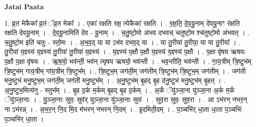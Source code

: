 \documentclass[17pt]{extarticle}
\begin{document}
\textbf{Jatai Paata} \newline

1. व्र॒त मेकैका᳚ व्र॒तं ॅव्र॒त मेका᳚ । . एका॑ रक्षति रक्ष॒ त्येकैका॑ रक्षति । . र॒क्ष॒ति॒ दे॒व॒यू॒नाम् दे॑वयू॒नाꣳ र॑क्षति रक्षति देवयू॒नाम् । . दे॒व॒यू॒नामिति॑ देव - यू॒नाम् । . च॒तु॒ष्टो॒मो अ॑भव दभवच् चतुष्टो॒म श्च॑तुष्टो॒मो अ॑भवत् । . च॒तु॒ष्टो॒म इति॑ चतुः - स्तो॒मः । . अ॒भ॒व॒द् या या ऽभ॑व दभव॒द् या । . या तु॒रीया॑ तु॒रीया॒ या या तु॒रीया᳚ । . तु॒रीया॑ य॒ज्ञ्स्य॑ य॒ज्ञ्स्य॑ तु॒रीया॑ तु॒रीया॑ य॒ज्ञ्स्य॑ । . य॒ज्ञ्स्य॑ प॒क्षौ प॒क्षौ य॒ज्ञ्स्य॑ य॒ज्ञ्स्य॑ प॒क्षौ । . प॒क्षा वृ॑षय ऋषयः प॒क्षौ प॒क्षा वृ॑षयः । . ऋ॒ष॒यो॒ भव॑न्ती॒ भव॑न् त्यृषय ऋषयो॒ भव॑न्ती । . भव॒न्तीति॒ भव॑न्ती । . गा॒य॒त्रीम् त्रि॒ष्टुभ॑म् त्रि॒ष्टुभ॑म् गाय॒त्रीम् गा॑य॒त्रीम् त्रि॒ष्टुभ᳚म् । . त्रि॒ष्टुभ॒म् जग॑ती॒म् जग॑तीम् त्रि॒ष्टुभ॑म् त्रि॒ष्टुभ॒म् जग॑तीम् । . जग॑ती मनु॒ष्टुभ॑ मनु॒ष्टुभ॒म् जग॑ती॒म् जग॑ती मनु॒ष्टुभ᳚म् । . अ॒नु॒ष्टुभ॑म् बृ॒हद् बृ॒ह द॑नु॒ष्टुभ॑ मनु॒ष्टुभ॑म् बृ॒हत् । . अ॒नु॒ष्टुभ॒मित्य॑नु - स्तुभ᳚म् । . बृ॒ह द॒र्क म॒र्कम् बृ॒हद् बृ॒ह द॒र्कम् । . अ॒र्कं ॅयु॑ञ्जा॒ना यु॑ञ्जा॒ना अ॒र्क म॒र्कं ॅयु॑ञ्जा॒नाः । . यु॒ञ्जा॒नाः सुवः॒ सुव॑र् युञ्जा॒ना यु॑ञ्जा॒नाः सुवः॑ । . सुव॒रा सुवः॒ सुव॒रा । . आ ऽभ॑रन् नभर॒न् ना ऽभ॑रन्न् । . अ॒भ॒र॒न् नि॒द मि॒द म॑भरन् नभरन् नि॒दम् । . इ॒दमिती॒दम् । . प॒ञ्चभि॑र् धा॒ता धा॒ता प॒ञ्चभिः॑ प॒ञ्चभि॑र् धा॒ता । \newline
\end{document}
